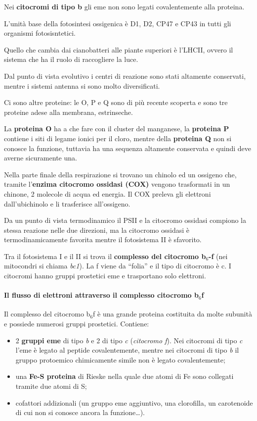 \documentclass[]{article}
\begin{document}
Nei \textbf{citocromi di tipo b} gli eme non sono legati covalentemente
alla proteina.

L'unità base della fotosintesi ossigenica è D1, D2, CP47 e CP43 in tutti
gli organismi fotosisntetici.

Quello che cambia dai cianobatteri alle piante superiori è l'LHCII,
ovvero il sistema che ha il ruolo di raccogliere la luce.

Dal punto di vista evolutivo i centri di reazione sono stati altamente
conservati, mentre i sistemi antenna si sono molto diversificati.

Ci sono altre proteine: le O, P e Q sono di più recente scoperta e sono
tre proteine adese alla membrana, estrinseche.

La \textbf{proteina O} ha a che fare con il cluster del manganese, la
\textbf{proteina P} contiene i siti di legame ionici per il cloro,
mentre della \textbf{proteina Q} non si conosce la funzione, tuttavia ha
una sequenza altamente conservata e quindi deve averne sicuramente una.

Nella parte finale della respirazione si trovano un chinolo ed un
ossigeno che, tramite l'\textbf{enzima citocromo ossidasi (COX)} vengono
trasformati in un chinone, 2 molecole di acqua ed energia. Il COX
preleva gli elettroni dall'ubichinolo e li trasferisce all'ossigeno.

Da un punto di vista termodinamico il PSII e la citocromo ossidasi
compiono la stessa reazione nelle due direzioni, ma la citocromo
ossidasi è termodinamicamente favorita mentre il fotosistema II è
sfavorito.

Tra il fotosistema I e il II si trova il \textbf{complesso del citocromo
b$_6$-f} (nei mitocondri si chiama \emph{bc1}). La f viene da ``folia''
e il tipo di citocromo è c. I citocromi hanno gruppi prostetici eme e
trasportano solo elettroni.

\paragraph{Il flusso di elettroni attraverso il complesso citocromo
b$_6$f}\label{il-flusso-di-elettroni-attraverso-il-complesso-citocromo-bux5f6f}

Il complesso del citocromo b$_6$f è una grande proteina costituita da
molte subunità e possiede numerosi gruppi prostetici. Contiene:

\begin{itemize}
\itemsep1pt\parskip0pt
\item
  2 \textbf{gruppi eme} di tipo \emph{b} e 2 di tipo \emph{c}
  (\emph{citocromo f}). Nei citocromi di tipo \emph{c} l'eme è legato al
  peptide covalentemente, mentre nei citocromi di tipo \emph{b} il
  gruppo protoemico chimicamente simile non è legato covalentemente;
\item
  una \textbf{Fe-S proteina} di Rieske nella quale due atomi di Fe sono
  collegati tramite due atomi di S;
\item
  cofattori addizionali (un gruppo eme aggiuntivo, una clorofilla, un
  carotenoide di cui non si conosce ancora la funzione\ldots{}).
\end{itemize}
\end{document}
